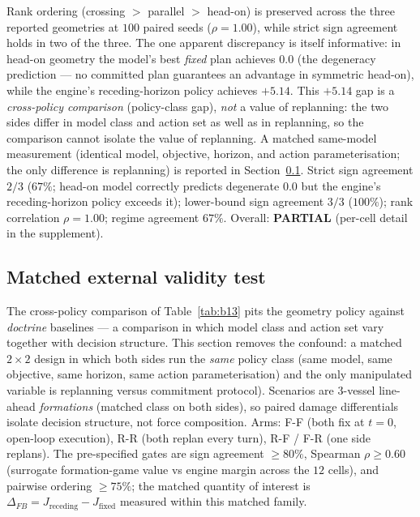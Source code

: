 \documentclass[12pt,a4paper]{article}
\begin{document}
Rank ordering (crossing $>$ parallel $>$ head-on) is preserved across the
three reported geometries at $100$ paired seeds ($\rho=1.00$), while strict
sign agreement holds in two of the three.  The one apparent discrepancy is itself
informative: in head-on geometry the model's best \emph{fixed} plan
achieves $0.0$ (the degeneracy prediction --- no committed plan guarantees
an advantage in symmetric head-on), while the engine's receding-horizon
policy achieves $+5.14$.  This $+5.14$ gap is a \emph{cross-policy
comparison} (policy-class gap), \emph{not} a value of replanning: the two
sides differ in model class and action set as well as in replanning, so
the comparison cannot isolate the value of replanning.  A matched
same-model measurement (identical model, objective, horizon, and action
parameterisation; the only difference is replanning) is reported in
Section~\ref{sec:matched}.
Strict sign agreement $2/3$ ($67\%$; head-on model correctly predicts
degenerate $0.0$ but the engine's receding-horizon policy exceeds it);
lower-bound sign agreement $3/3$ ($100\%$); rank correlation $\rho=1.00$;
regime agreement $67\%$.  Overall: \textbf{PARTIAL} (per-cell detail in
the supplement).

\subsection{Matched external validity test}\label{sec:matched}

The cross-policy comparison of Table~\ref{tab:b13} pits the geometry
policy against \emph{doctrine} baselines --- a comparison in which model
class and action set vary together with decision structure.  This section removes the confound: a matched
$2\times2$ design in which both sides run the \emph{same} policy class
(same model, same objective, same horizon, same action parameterisation)
and the only manipulated variable is replanning versus commitment
protocol).  Scenarios are $3$-vessel line-ahead \emph{formations}
(matched class on both sides), so paired damage differentials isolate
decision structure, not force composition.  Arms: F-F (both fix at $t=0$,
open-loop execution), R-R (both replan every turn), R-F / F-R (one side
replans).  The pre-specified gates are sign agreement $\ge80\%$, Spearman
$\rho\ge0.60$ (surrogate formation-game value vs engine margin across the
$12$ cells), and pairwise ordering $\ge75\%$; the matched quantity of interest is
$\Delta_{FB}=J_{\text{receding}}-J_{\text{fixed}}$ measured within this
matched family.
\end{document}
